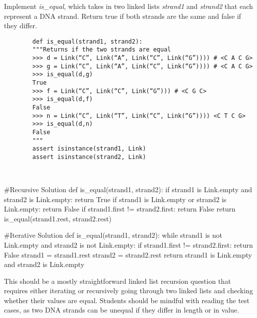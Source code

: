 

\begin{blocksection}
    \question Implement \textit{is\_equal}, which takes in two linked lists \textit{strand1} and \textit{strand2} that each represent a DNA strand. Return true if both strands are the same and false if they differ.

    
    
    \begin{lstlisting}
        def is_equal(strand1, strand2):
        """Returns if the two strands are equal 
        >>> d = Link(“C”, Link(“A”, Link(“C”, Link(“G”)))) # <C A C G>
        >>> g = Link(“C”, Link(“A”, Link(“C”, Link(“G”)))) # <C A C G>
        >>> is_equal(d,g)
        True
        >>> f = Link(“C”, Link(“C”, Link(“G”))) # <C G C>
        >>> is_equal(d,f)
        False
        >>> n = Link(“C”, Link(“T”, Link(“C”, Link(“G”)))) <C T C G>
        >>> is_equal(d,n)
        False
        """
        assert isinstance(strand1, Link)
        assert isinstance(strand2, Link)
        	
        
    \end{lstlisting}
    
    \begin{solution}
        #Recursive Solution
        def is_equal(strand1, strand2):
            if strand1 is Link.empty and strand2 is Link.empty:
                return True
            if strand1 is Link.empty or strand2 is Link.empty:
                return False
            if strand1.first != strand2.first:
                return False
            return is_equal(strand1.rest, strand2.rest)

        #Iterative Solution
        def is_equal(strand1, strand2):
            while strand1 is not Link.empty and strand2 is not Link.empty:
                if strand1.first != strand2.first:
                    return False
                strand1 = strand1.rest
                strand2 = strand2.rest
            return strand1 is Link.empty and strand2 is Link.empty

    \end{solution}
    \end{blocksection}
    
    \begin{questionmeta}
        This should be a mostly straightforward linked list recursion question that requires either iterating or recursively going through two linked lists and checking whether their values are equal. Students should be mindful with reading the test cases, as two DNA strands can be unequal if they differ in length or in value.  
    \end{questionmeta}
    